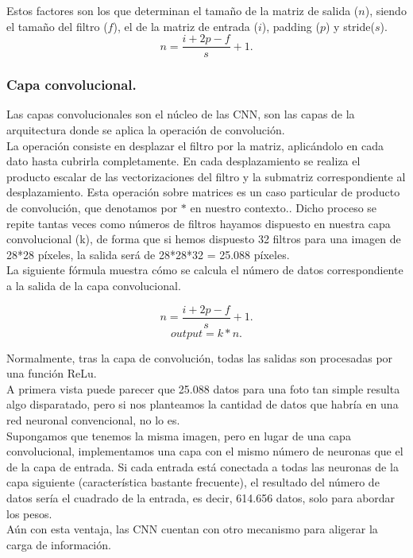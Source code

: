 \documentclass[a4paper,11pt]{article}
\begin{document}
Estos factores son los que determinan el tamaño de la matriz de salida ($n$), siendo el tamaño del filtro ($f$), el de la matriz de entrada ($i$), padding ($p$) y stride($s$).
\[
n=\frac{i+2p-f}{s}  +1.
\]


\subsubsection{Capa convolucional.}
Las capas convolucionales son el núcleo de las CNN, son las capas de la arquitectura donde se aplica la operación de convolución. \\

\noindent
La operación consiste en desplazar el filtro por la matriz, aplicándolo en cada dato hasta cubrirla completamente. En cada desplazamiento se realiza el producto escalar de las vectorizaciones del filtro y la submatriz correspondiente al desplazamiento. Esta operación sobre matrices es un caso particular de producto de convolución, que denotamos por $*$ en nuestro contexto.. Dicho proceso se repite tantas veces como números de filtros hayamos dispuesto en nuestra capa convolucional (k), de forma que si hemos dispuesto 32 filtros para una imagen de 28*28 píxeles, la salida será de 28*28*32 = 25.088 píxeles.\\

\noindent
La siguiente fórmula muestra cómo se calcula el número de datos correspondiente a la salida de la capa convolucional.

\[
n=\frac{i+2p-f}{s}  +1.
\]
\[
output = k * n.
\]

Normalmente, tras la capa de convolución, todas las salidas son procesadas por una función ReLu.\\

\noindent
A primera vista puede parecer que 25.088 datos para una foto tan simple resulta algo disparatado, pero si nos planteamos la cantidad de datos que habría en una red neuronal convencional, no lo es. \\

\noindent
Supongamos que tenemos la misma imagen, pero en lugar de una capa convolucional, implementamos una capa con el mismo número de neuronas que el de la capa de entrada. Si cada entrada está conectada a todas las neuronas de la capa siguiente (característica bastante frecuente), el resultado del número de datos sería el cuadrado de la entrada, es decir, 614.656 datos, solo para abordar los pesos. \\

\noindent
Aún con esta ventaja, las CNN cuentan con otro mecanismo para aligerar la carga de información.
\end{document}
